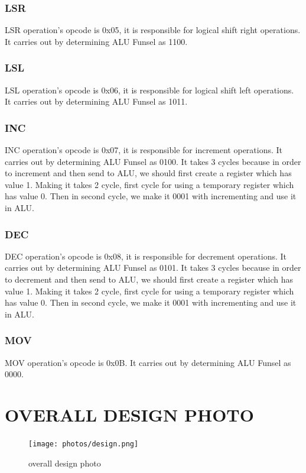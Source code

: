\documentclass[pdftex,12pt,a4paper]{article}
\begin{document}
\subsubsection{LSR}
    LSR operation's opcode is 0x05, it is responsible for logical shift right operations. It carries out by determining ALU Funsel as 1100.
\subsubsection{LSL}
    LSL operation's opcode is 0x06, it is responsible for logical shift left operations. It carries out by determining ALU Funsel as 1011.
\subsubsection{INC}
    INC operation's opcode is 0x07, it is responsible for increment operations. It carries out by determining ALU Funsel as 0100.
It takes 3 cycles because in order to increment and then send to ALU, we should first create a register
which has value 1. Making it takes 2 cycle, first cycle for using a temporary register which has value 0.
Then in second cycle, we make it 0001 with incrementing and use it in ALU.
\subsubsection{DEC}
    DEC operation's opcode is 0x08, it is responsible for decrement operations. It carries out by determining ALU Funsel as 0101.
It takes 3 cycles because in order to decrement and then send to ALU, we should first create a register
which has value 1. Making it takes 2 cycle, first cycle for using a temporary register which has value 0.
Then in second cycle, we make it 0001 with incrementing and use it in ALU.
\subsubsection{MOV}
    MOV operation's opcode is 0x0B. It carries out by determining ALU Funsel as 0000.


\section{OVERALL DESIGN PHOTO}


\begin{figure}[H]
    \centering
    \texttt{[image: photos/design.png]}	
    \caption{overall design photo}
    \label{implementation}
\end{figure}
\end{document}
